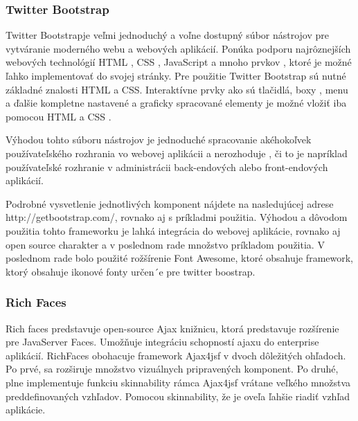\subsubsection{Twitter Bootstrap}
Twitter Bootstrapje veľmi jednoduchý a voľne dostupný súbor nástrojov pre vytváranie moderného webu a webových aplikácií.\cite{boot} Ponúka podporu najrôznejších webových technológií HTML , CSS , JavaScript a mnoho prvkov , ktoré je možné ľahko implementovať do svojej stránky. Pre použitie Twitter Bootstrap sú nutné základné znalosti HTML a CSS. Interaktívne prvky ako sú tlačidlá, boxy , menu a ďalšie kompletne nastavené a graficky spracované elementy je možné vložiť iba pomocou HTML a CSS .

Výhodou tohto súboru nástrojov je jednoduché spracovanie akéhokoľvek používateľského rozhrania vo webovej aplikácii a nerozhoduje , či to je napríklad používateľské rozhranie v administrácii back-endových alebo front-endových aplikácií.


Podrobné vysvetlenie jednotlivých komponent nájdete na nasledujúcej adrese http://getbootstrap.com/, rovnako aj s príkladmi použitia. Výhodou a dôvodom použitia tohto frameworku je lahká integrácia do webovej aplikácie, rovnako aj open source charakter a v poslednom rade množstvo príkladom použitia. V poslednom rade bolo použité rožšírenie Font Awesome, ktoré obsahuje framework, ktorý obsahuje ikonové fonty určen´e pre twitter boostrap.


\subsubsection{Rich Faces}
Rich faces predstavuje open-source Ajax knižnicu, ktorá predstavuje rozšírenie pre JavaServer Faces. Umožňuje integráciu schopností ajaxu do enterprise aplikácií. RichFaces obohacuje framework Ajax4jsf v dvoch dôležitých ohľadoch. Po prvé, sa rozširuje množstvo vizuálnych pripravených komponent. Po druhé,  plne implementuje funkciu skinnability rámca Ajax4jsf vrátane veľkého množstva preddefinovaných vzhľadov. Pomocou skinnability, že je oveľa ľahšie riadiť vzhľad aplikácie.





